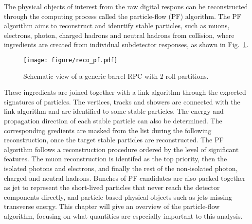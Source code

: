 The physical objects of interest from the raw digital respons can be reconstructed through the computing process called the particle-flow (PF) algorithm.
The PF algorithm aims to reconstruct and idenrtify stable particles, such as muons, electrons, photon, charged hadrons and neutral hadrons from collision, where ingredients are created from individual subdetector responses, as shown in Fig.~\ref{fig:reco_pf}.
\begin{figure}[H]\centering
    \texttt{[image: figure/reco\_pf.pdf]}
    \caption{Schematic view of a generic barrel RPC with 2 roll partitions.}
    \label{fig:reco_pf}
\end{figure}

These ingredients are joined together with a link algorithm through the expected signatures of particles.
The vertices, tracks and showers are connected with the link algorithm and are identified to some stable particles.
The energy and propagation direction of each stable particle can also be determined.
The corresponding gredients are masked from the list during the following reconstruction, once the target stable particles are reconstructed.
The PF algorithm follows a reconstruction procedure ordered by the level of significant features.
The muon reconstruction is identifed as the top priority, then the isolated photons and electrons, and finally the rest of the non-isolated photon, charged and neutral hadrons.
Bunches of PF candidates are also packed together as jet to represent the short-lived particles that never reach the detector components directly, and particle-based physical objects such as jets missing transverse energy.
This chapter will give an overview of the particle-flow algorithm, focusing on what quantities are especially important to this analysis.

